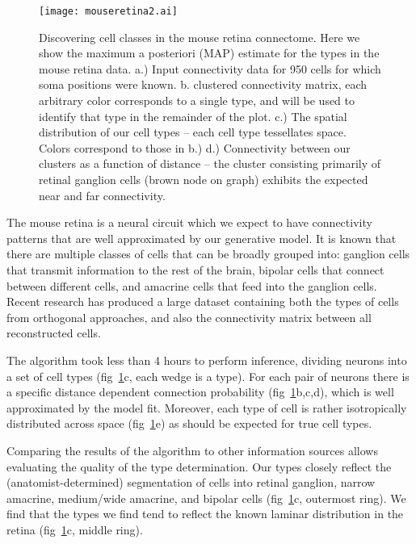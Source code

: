 \documentclass{article}
\begin{document}
{\begin{figure}
  \centering 
  \centerline{\texttt{[image: mouseretina2.ai]}}
  \caption{Discovering cell classes in the mouse retina connectome. Here
we show the maximum a posteriori (MAP) estimate for the types in the mouse
retina data. 
    a.) Input connectivity data for 950 cells for which soma positions
    were known. b. clustered connectivity matrix, each arbitrary color
    corresponds to a single type, and will be used to identify that type in the remainder
    of the plot. c.)  The spatial distribution of our cell types
    -- each cell type tessellates space. Colors correspond to those in b.)
    d.) Connectivity between our clusters as a function
    of distance -- the cluster consisting primarily of retinal
    ganglion cells (brown node on graph) exhibits the expected near and
    far connectivity.}
\label{fig:mouseretina}
\end{figure}

The mouse retina \autocite{Masland2001} is a neural circuit which we
expect to have connectivity patterns that are well approximated by our
generative model. It is known that there are multiple classes of cells
that can be broadly grouped into: ganglion cells that transmit
information to the rest of the brain, bipolar cells that connect
between different cells, and amacrine cells that feed into the
ganglion cells. Recent research \autocite{Helmstaedter2013} has
produced a large dataset containing both the types of cells from
orthogonal approaches, and also the connectivity matrix between all
reconstructed cells.

The algorithm took less than 4 hours to perform inference, dividing
neurons into a set of cell types (fig~\ref{fig:mouseretina}c, each
wedge is a type). For each pair of neurons there is a specific
distance dependent connection probability
(fig~\ref{fig:mouseretina}b,c,d), which is well approximated by the
model fit. Moreover, each type of cell is rather isotropically
distributed across space (fig~\ref{fig:mouseretina}e) as should be
expected for true cell types.

Comparing the results of the algorithm to other information sources
allows evaluating the quality of the type determination. Our types
closely reflect the (anatomist-determined) segmentation of cells into
retinal ganglion, narrow amacrine, medium/wide amacrine, and bipolar
cells (fig~\ref{fig:mouseretina}c, outermost ring). We find that the
types we find tend to reflect the known laminar distribution in the
retina (fig~\ref{fig:mouseretina}c, middle ring). 

}
\end{document}
